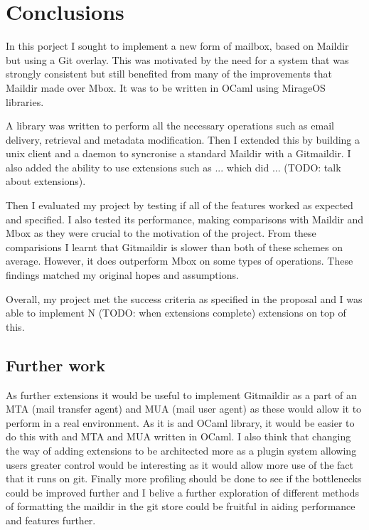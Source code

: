 \chapter{Conclusions}

In this porject I sought to implement a new form of mailbox, based on Maildir but using a Git overlay. This was motivated by the need for a system that was strongly consistent but still benefited from many of the improvements that Maildir made over Mbox. It was to be written in OCaml using MirageOS libraries. 

A library was written to perform all the necessary operations such as email delivery, retrieval and metadata modification. Then I extended this by building a unix client and a daemon to syncronise a standard Maildir with a Gitmaildir. I also added the ability to use extensions such as ... which did ... (TODO: talk about extensions).

Then I evaluated my project by testing if all of the features worked as expected and specified. I also tested its performance, making comparisons with Maildir and Mbox as they were crucial to the motivation of the project. From these comparisions I learnt that Gitmaildir is slower than both of these schemes on average. However, it does outperform Mbox on some types of operations. These findings matched my original hopes and assumptions.

Overall, my project met the success criteria as specified in the proposal and I was able to implement N (TODO: when extensions complete) extensions on top of this.

\section{Further work}

As further extensions it would be useful to implement Gitmaildir as a part of an MTA (mail transfer agent) and MUA (mail user agent) as these would allow it to perform in a real environment. As it is and OCaml library, it would be easier to do this with and MTA and MUA written in OCaml. I also think that changing the way of adding extensions to be architected more as a plugin system allowing users greater control would be interesting as it would allow more use of the fact that it runs on git. Finally more profiling should be done to see if the bottlenecks could be improved further and I belive a further exploration of different methods of formatting the maildir in the git store could be fruitful in aiding performance and features further.

